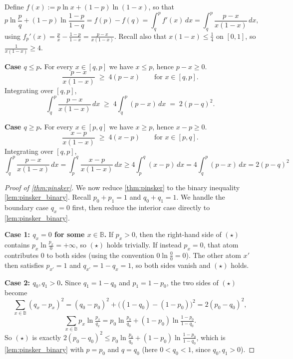 \documentclass[fontsize=11pt, parskip=half]{scrartcl}
\begin{document}
    Define $f(x) := p \ln x + (1-p) \ln (1-x)$, so that
    \[
    p \ln \frac{p}{q} + (1-p) \ln \frac{1-p}{1-q} = f(p) - f(q)
    = \int_q^p f'(x)\, dx
    = \int_q^p \frac{p-x}{x(1-x)}\, dx,
    \]
    using $f_p'(x) = \frac{p}{x} - \frac{1-p}{1-x} = \frac{p-x}{x(1-x)}$. Recall also that $x(1-x) \leq \tfrac14$ on $[0,1]$, so $\frac{1}{x(1-x)} \geq 4$.
    
    \textbf{Case $q \leq p$.} For every $x \in [q,p]$ we have $x \leq p$, hence $p - x \geq 0$.
    \[
    \frac{p-x}{x(1-x)} \;\geq\; 4(p-x) \qquad \text{for } x \in [q,p].
    \]
    Integrating over $[q,p]$,
    \[
    \int_q^p \frac{p-x}{x(1-x)}\, dx \;\geq\; 4 \int_q^p (p-x)\, dx \;=\; 2(p-q)^2.
    \]
    
    \textbf{Case $q \geq p$.} For every $x \in [p,q]$ we have $x \geq p$, hence $x - p \geq 0$. 
    \[
    \frac{x-p}{x(1-x)} \;\geq\; 4(x-p) \qquad \text{for } x \in [p,q].
    \]
    Integrating over $[q,p]$,
    \[
    \int_q^p \frac{p-x}{x(1-x)}\, dx
    = \int_p^q \frac{x-p}{x(1-x)}\, dx
    \geq 4 \int_p^q (x-p)\, dx
    = 4 \int_q^p (p-x)\, dx
    = 2(p-q)^2
    \]

\begin{proof}[Proof of \cref{thm:pinsker}]
    We now reduce \cref{thm:pinsker} to the binary inequality \cref{lem:pinsker_binary}.
    Recall $p_0 + p_1 = 1$ and $q_0 + q_1 = 1$. We handle the boundary case
$q_x = 0$ first, then reduce the interior case directly to
\cref{lem:pinsker_binary}.

\medskip
\textbf{Case 1: $q_x = 0$ for some $x \in \mathbb{B}$.}
If $p_x > 0$, then the right-hand side of $(\star)$ contains
$p_x \ln \tfrac{p_x}{0} = +\infty$, so $(\star)$ holds trivially.
If instead $p_x = 0$, that atom contributes $0$ to both sides
(using the convention $0 \ln \tfrac{0}{0} = 0$). The other atom $x'$ then
satisfies $p_{x'} = 1$ and $q_{x'} = 1 - q_x = 1$, so both sides vanish and
$(\star)$ holds.

\medskip
\textbf{Case 2: $q_0, q_1 > 0$.}
Since $q_1 = 1 - q_0$ and $p_1 = 1 - p_0$, the two sides of $(\star)$ become
\[
    \sum_{x \in \mathbb{B}} (q_x - p_x)^2
    = (q_0 - p_0)^2 + \big((1-q_0) - (1-p_0)\big)^2
    = 2(p_0 - q_0)^2,
\]
\[
    \sum_{x \in \mathbb{B}} p_x \ln \tfrac{p_x}{q_x}
    = p_0 \ln \tfrac{p_0}{q_0} + (1 - p_0) \ln \tfrac{1 - p_0}{1 - q_0}.
\]
So $(\star)$ is exactly
$2(p_0 - q_0)^2 \leq p_0 \ln \tfrac{p_0}{q_0} + (1 - p_0) \ln \tfrac{1 - p_0}{1 - q_0}$,
which is \cref{lem:pinsker_binary} with $p = p_0$ and $q = q_0$
(here $0 < q_0 < 1$, since $q_0, q_1 > 0$).
\end{proof}
\end{document}
